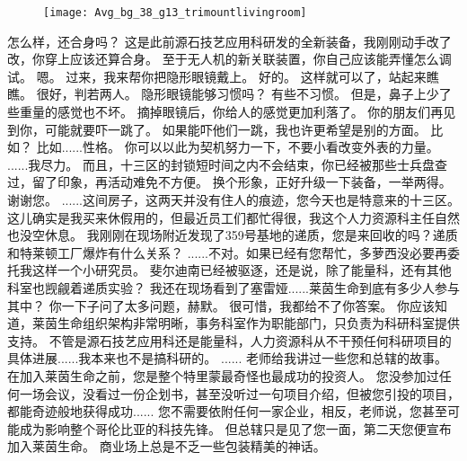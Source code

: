 \documentclass[openany]{book}
\begin{document}
\begin{figure}[h]
    \centering
    \texttt{[image: Avg\_bg\_38\_g13\_trimountlivingroom]}
\end{figure}
\begin{dialogue}
     怎么样，还合身吗？
     这是此前源石技艺应用科研发的全新装备，我刚刚动手改了改，你穿上应该还算合身。
     至于无人机的新关联装置，你自己应该能弄懂怎么调试。
     嗯。
     过来，我来帮你把隐形眼镜戴上。
     好的。
     这样就可以了，站起来瞧瞧。
     很好，判若两人。
     隐形眼镜能够习惯吗？
     有些不习惯。
     但是，鼻子上少了些重量的感觉也不坏。
     摘掉眼镜后，你给人的感觉更加利落了。
     你的朋友们再见到你，可能就要吓一跳了。
     如果能吓他们一跳，我也许更希望是别的方面。
     比如？
     比如......性格。
     你可以以此为契机努力一下，不要小看改变外表的力量。
     ......我尽力。
     而且，十三区的封锁短时间之内不会结束，你已经被那些士兵盘查过，留了印象，再活动难免不方便。
     换个形象，正好升级一下装备，一举两得。
     谢谢您。
     ......这间房子，这两天并没有住人的痕迹，您今天也是特意来的十三区。
     这儿确实是我买来休假用的，但最近员工们都忙得很，我这个人力资源科主任自然也没空休息。
     我刚刚在现场附近发现了359号基地的递质，您是来回收的吗？递质和特莱顿工厂爆炸有什么关系？
     ......不对。如果已经有您帮忙，多萝西没必要再委托我这样一个小研究员。
     斐尔迪南已经被驱逐，还是说，除了能量科，还有其他科室也觊觎着递质实验？
     我还在现场看到了塞雷娅......莱茵生命到底有多少人参与其中？
     你一下子问了太多问题，赫默。
     很可惜，我都给不了你答案。
     你应该知道，莱茵生命组织架构非常明晰，事务科室作为职能部门，只负责为科研科室提供支持。
     不管是源石技艺应用科还是能量科，人力资源科从不干预任何科研项目的具体进展......我本来也不是搞科研的。
     ......
     老师给我讲过一些您和总辖的故事。
     在加入莱茵生命之前，您是整个特里蒙最奇怪也最成功的投资人。
     您没参加过任何一场会议，没看过一份企划书，甚至没听过一句项目介绍，但被您引投的项目，都能奇迹般地获得成功......
     您不需要依附任何一家企业，相反，老师说，您甚至可能成为影响整个哥伦比亚的科技先锋。
     但总辖只是见了您一面，第二天您便宣布加入莱茵生命。
     商业场上总是不乏一些包装精美的神话。

\end{dialogue}
\end{document}
